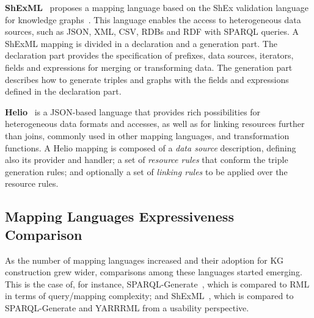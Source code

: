 \noindent\textbf{ShExML}~\parencite{Garcia-Gonzalez2020shexml,shexml} proposes a mapping language based on the ShEx validation language for knowledge graphs~\parencite{prud2014shex}. This language enables the access to heterogeneous data sources, such as JSON, XML, CSV, RDBs and RDF with SPARQL queries. A ShExML mapping is divided in a declaration and a generation part. The declaration part provides the specification of prefixes, data sources, iterators, fields and expressions for merging or transforming data. The generation part describes how to generate triples and graphs with the fields and expressions defined in the declaration part. 

\noindent\textbf{Helio}~\parencite{cimmino2022helio} is a JSON-based language that provides rich possibilities for heterogeneous data formats and accesses, as well as for linking resources further than joins, commonly used in other mapping languages, and transformation functions. A Helio mapping is composed of a \textit{data source} description, defining also its provider and handler; a set of \textit{resource rules} that conform the triple generation rules; and optionally a set of \textit{linking rules} to be applied over the resource rules. 








\subsection{Mapping Languages Expressiveness Comparison}
\label{sec:chp2_language-comparison}

As the number of mapping languages increased and their adoption for KG construction grew wider, comparisons among these languages started emerging. This is the case of, for instance, SPARQL-Generate~\parencite{Lefrancois2017sparqlgenerate}, which is compared to RML in terms of query/mapping complexity; and ShExML~\parencite{Garcia-Gonzalez2020shexml}, which is compared to SPARQL-Generate and YARRRML from a usability perspective.

